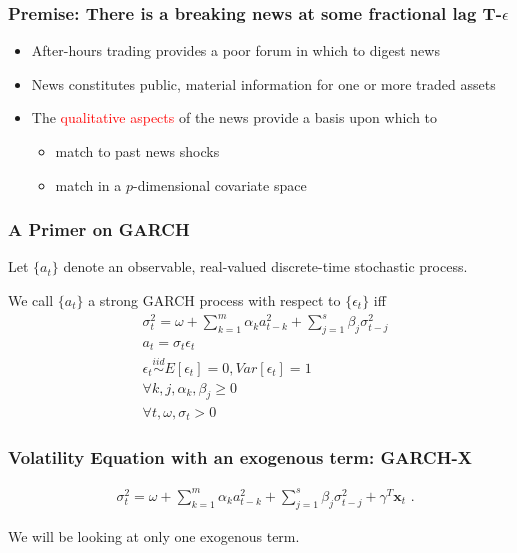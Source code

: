 \documentclass[9pt]{beamer}
\newcommand{\x}{\textbf{x}}
\newcommand{\simiid}{\stackrel{iid}{\sim}} %
\theoremstyle{definition}
\begin{document}

\begin{frame}
\frametitle{Premise: There is a breaking news at some fractional lag T-$\epsilon$}

\begin{itemize}
\item After-hours trading provides a poor forum in which to digest news
\item News constitutes public, material information for one or more traded assets
\item The \textcolor{red}{qualitative aspects} of the news provide a basis upon which to 
\begin{itemize}
    \item match to past news shocks
    \item match in a $p$-dimensional covariate space
\end{itemize}
\end{itemize}
\end{frame}

\begin{frame}
    \frametitle{A Primer on GARCH}
   
    \begin{Definition}

    Let $\{a_{t}\}$ denote an observable, real-valued discrete-time stochastic process.\\
    
    \bigbreak
    
    We call $\{a_{t}\}$ a strong GARCH process \parencite[][]{francq2019garch} with respect to $\{\epsilon_{t}\}$ iff 
    \begin{align*}
        &\sigma_{t}^{2} = \omega + \sum^{m}_{k=1}\alpha_{k}a^{2}_{t-k} + \sum_{j=1}^{s}\beta_{j}\sigma_{t-j}^{2}\\
        &a_{t} = \sigma_{t}\epsilon_{t}\\
        &\epsilon_{t} \simiid E[\epsilon_{t}]=0, Var[\epsilon_{t}] = 1\\
        &\forall k,j, \alpha_{k},\beta_{j}\geq 0\\ 
        &\forall t, \omega, \sigma_{t} > 0 
        \end{align*}

    \end{Definition}

\end{frame}

\begin{frame}
    \frametitle{Volatility Equation with an exogenous term: GARCH-X}
    
    \begin{align*}
        &\sigma_{t}^{2} = \omega+ \sum^{m}_{k=1}\alpha_{k}a^{2}_{t-k} + \sum_{j=1}^{s}\beta_{j}\sigma_{t-j}^{2} + \gamma^{T}\x_{t} \text{ .}\label{GARCH-X}
    \end{align*}

    We will be looking at only one exogenous term.

    \end{frame}
    
\end{document}
